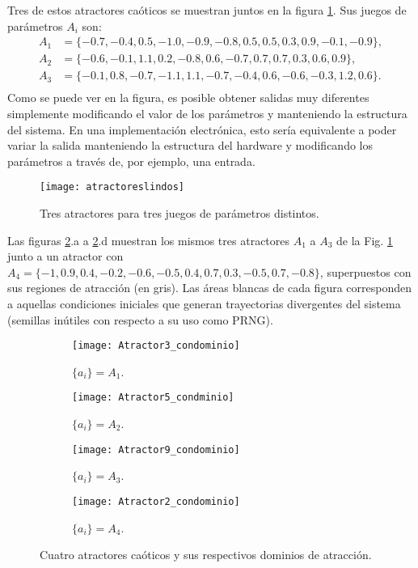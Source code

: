 Tres de estos atractores caóticos se muestran juntos en la figura \ref{fig:atractoresQMaps}.
Sus juegos de parámetros $A_i$ son:	
%
\begin{eqnarray}
A_1&=\{-0.7,-0.4,0.5,-1.0,-0.9,-0.8,0.5,0.5,0.3,0.9,-0.1,-0.9\},\nonumber\\
A_2&=\{-0.6,-0.1,1.1,0.2,-0.8,0.6,-0.7,0.7,0.7,0.3,0.6,0.9\}, \nonumber\\
A_3&=\{ -0.1,0.8,-0.7,-1.1,1.1,-0.7,-0.4,0.6,-0.6,-0.3,1.2,0.6\}.\nonumber\\
\end{eqnarray}
%
Como se puede ver en la figura, es posible obtener salidas muy diferentes simplemente modificando el valor de los parámetros y manteniendo la estructura del sistema.
En una implementación electrónica, esto sería equivalente a poder variar la salida manteniendo la estructura del hardware y modificando los parámetros a través de, por ejemplo, una entrada.
%
\begin{figure}
	\centering
	\texttt{[image: atractoreslindos]}\\
	\caption{Tres atractores para tres juegos de parámetros distintos.}\label{fig:atractoresQMaps}
\end{figure}

Las figuras \ref{fig:atractores3592}.a a \ref{fig:atractores3592}.d muestran los mismos tres atractores $A_1$ a $A_3$ de la Fig. \ref{fig:atractoresQMaps} junto a un atractor con $A_4=\{-1,0.9,0.4,-0.2,-0.6,-0.5,0.4,0.7,0.3,-0.5,0.7,-0.8\}$, superpuestos con sus regiones de atracción (en gris).
Las áreas blancas de cada figura corresponden a aquellas condiciones iniciales que generan trayectorias divergentes del sistema (semillas inútiles con respecto a su uso como PRNG).	
%
\begin{figure}
	\centering
	\begin{subfigure}[b]{0.49\textwidth}
		\texttt{[image: Atractor3\_condominio]}
		\caption{$\{a_i\}=A_1$.}
	\end{subfigure}
	\hfill 
	\begin{subfigure}[b]{0.49\textwidth}
		\texttt{[image: Atractor5\_condminio]}
		\caption{$\{a_i\}=A_2$.}
	\end{subfigure}
	\hfill 
	\begin{subfigure}[b]{0.49\textwidth}
		\texttt{[image: Atractor9\_condominio]}
		\caption{$\{a_i\}=A_3$.}
	\end{subfigure}
	\hfill  
	\begin{subfigure}[b]{0.49\textwidth}
		\texttt{[image: Atractor2\_condominio]}
		\caption{$\{a_i\}=A_4$.}
	\end{subfigure}
	\caption{Cuatro atractores caóticos y sus respectivos dominios de atracción.}
	\label{fig:atractores3592}
\end{figure}
